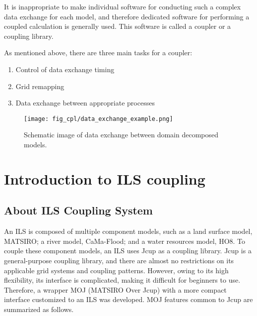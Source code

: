 It is inappropriate to make individual software for conducting such a
complex data exchange for each model, and therefore dedicated software
for performing a coupled calculation is generally used. This software is
called a coupler or a coupling library.

As mentioned above, there are three main tasks for a coupler:

\begin{enumerate}
\def\labelenumi{\arabic{enumi}.}
\item
  Control of data exchange timing
\item
  Grid remapping
\item
  Data exchange between appropriate processes
\end{enumerate}

\begin{figure}
\hypertarget{fig:data_exchange_example}{%
\centering
\texttt{[image: fig\_cpl/data\_exchange\_example.png]}
\caption{Schematic image of data exchange between domain decomposed
models.}\label{fig:data_exchange_example}
}
\end{figure}

\hypertarget{introduction-to-ils-coupling}{%
\section{Introduction to ILS
coupling}\label{introduction-to-ils-coupling}}

\hypertarget{about-ils-coupling-system}{%
\subsection{About ILS Coupling System}\label{about-ils-coupling-system}}

An ILS is composed of multiple component models, such as a land surface
model, MATSIRO; a river model, CaMa-Flood; and a water resources model,
HO8. To couple these component models, an ILS uses Jcup as a coupling
library. Jcup is a general-purpose coupling library, and there are
almost no restrictions on its applicable grid systems and coupling
patterns. However, owing to its high flexibility, its interface is
complicated, making it difficult for beginners to use. Therefore, a
wrapper MOJ (MATSIRO Over Jcup) with a more compact interface customized
to an ILS was developed. MOJ features common to Jcup are summarized as
follows.

